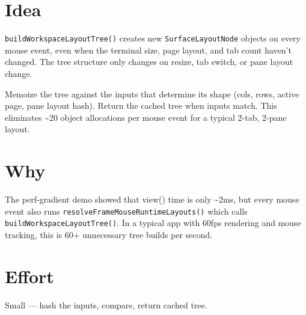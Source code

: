 \section{Idea}\label{record-399-idea}

\texttt{b\allowbreak{}u\allowbreak{}i\allowbreak{}l\allowbreak{}d\allowbreak{}W\allowbreak{}o\allowbreak{}r\allowbreak{}k\allowbreak{}s\allowbreak{}p\allowbreak{}a\allowbreak{}c\allowbreak{}e\allowbreak{}L\allowbreak{}a\allowbreak{}y\allowbreak{}o\allowbreak{}u\allowbreak{}t\allowbreak{}T\allowbreak{}r\allowbreak{}e\allowbreak{}e\allowbreak{}(\allowbreak{})} creates new \texttt{S\allowbreak{}u\allowbreak{}r\allowbreak{}f\allowbreak{}a\allowbreak{}c\allowbreak{}e\allowbreak{}L\allowbreak{}a\allowbreak{}y\allowbreak{}o\allowbreak{}u\allowbreak{}t\allowbreak{}N\allowbreak{}o\allowbreak{}d\allowbreak{}e} objects on every mouse event, even when the terminal size, page layout, and tab count haven't changed. The tree structure only changes on resize, tab switch, or pane layout change.

Memoize the tree against the inputs that determine its shape (cols, rows, active page, pane layout hash). Return the cached tree when inputs match. This eliminates \textasciitilde20 object allocations per mouse event for a typical 2-tab, 2-pane layout.

\section{Why}\label{record-399-why}

The perf-gradient demo showed that view() time is only \textasciitilde2ms, but every mouse event also runs \texttt{r\allowbreak{}e\allowbreak{}s\allowbreak{}o\allowbreak{}l\allowbreak{}v\allowbreak{}e\allowbreak{}F\allowbreak{}r\allowbreak{}a\allowbreak{}m\allowbreak{}e\allowbreak{}M\allowbreak{}o\allowbreak{}u\allowbreak{}s\allowbreak{}e\allowbreak{}R\allowbreak{}u\allowbreak{}n\allowbreak{}t\allowbreak{}i\allowbreak{}m\allowbreak{}e\allowbreak{}L\allowbreak{}a\allowbreak{}y\allowbreak{}o\allowbreak{}u\allowbreak{}t\allowbreak{}s\allowbreak{}(\allowbreak{})} which calls \texttt{b\allowbreak{}u\allowbreak{}i\allowbreak{}l\allowbreak{}d\allowbreak{}W\allowbreak{}o\allowbreak{}r\allowbreak{}k\allowbreak{}s\allowbreak{}p\allowbreak{}a\allowbreak{}c\allowbreak{}e\allowbreak{}L\allowbreak{}a\allowbreak{}y\allowbreak{}o\allowbreak{}u\allowbreak{}t\allowbreak{}T\allowbreak{}r\allowbreak{}e\allowbreak{}e\allowbreak{}(\allowbreak{})}. In a typical app with 60fps rendering and mouse tracking, this is 60+ unnecessary tree builds per second.

\section{Effort}\label{record-399-effort}

Small --- hash the inputs, compare, return cached tree.

